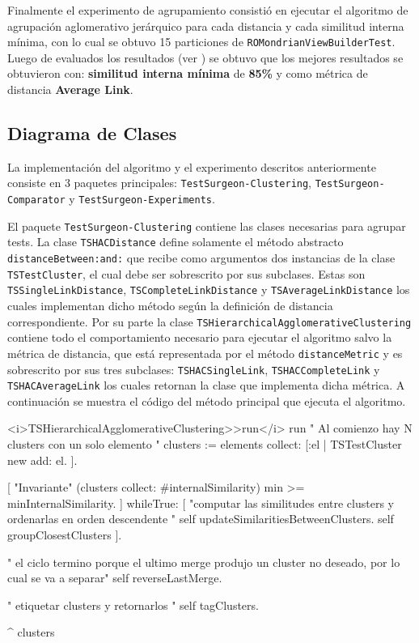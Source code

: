 
\par Finalmente el experimento de agrupamiento consistió en ejecutar el algoritmo de agrupación aglomerativo jerárquico para cada distancia y cada similitud interna mínima, con lo cual se obtuvo 15 particiones de {\tt ROMondrianViewBuilderTest}. Luego de evaluados los resultados (ver ) se obtuvo que los mejores resultados se obtuvieron con: \textbf{similitud interna mínima} de \textbf{85\%} y como métrica de distancia \textbf{Average Link}.

\clearpage
\subsection{Diagrama de Clases}

\par La implementación del algoritmo y el experimento descritos anteriormente consiste en 3 paquetes principales: {\tt TestSurgeon-Clustering},  {\tt TestSurgeon-Comparator} y {\tt TestSurgeon-Experiments}. 

\par El paquete {\tt TestSurgeon-Clustering} contiene las clases necesarias para agrupar tests. La clase {\tt TSHACDistance} define solamente el método abstracto {\tt distanceBetween:and:} que recibe como argumentos dos instancias de la clase {\tt TSTestCluster}, el cual debe ser sobrescrito por sus subclases. Estas son {\tt TSSingleLinkDistance}, {\tt TSCompleteLinkDistance} y {\tt TSAverageLinkDistance} los cuales implementan dicho método según la definición de distancia correspondiente. Por su parte la clase {\tt TSHierarchicalAgglomerativeClustering} contiene todo el comportamiento necesario para ejecutar el algoritmo salvo la métrica de distancia, que está representada por el método {\tt distanceMetric} y es sobrescrito por sus tres subclases: {\tt TSHACSingleLink}, {\tt TSHACCompleteLink} y {\tt TSHACAverageLink} los cuales retornan la clase que implementa dicha métrica. A continuación se muestra el código del método principal que ejecuta el algoritmo.


\begin{codeWithLineNumbers}
<i>TSHierarchicalAgglomerativeClustering>>run</i>
run
	" Al comienzo hay N clusters con un solo elemento "
	clusters := elements collect: [:el | TSTestCluster new add: el. ].
	
	[
		"Invariante"
		(clusters collect: #internalSimilarity) min >= minInternalSimilarity.
	] 
		whileTrue: [ 
			"computar las similitudes entre clusters y ordenarlas en orden descendente "
			self updateSimilaritiesBetweenClusters.
			self groupClosestClusters
	].
		
	" el ciclo termino porque el ultimo merge produjo un cluster no deseado, por lo cual se va a separar"
	self reverseLastMerge. 
	
	" etiquetar clusters y retornarlos "
	self tagClusters.
	
	^ clusters
\end{codeWithLineNumbers}

